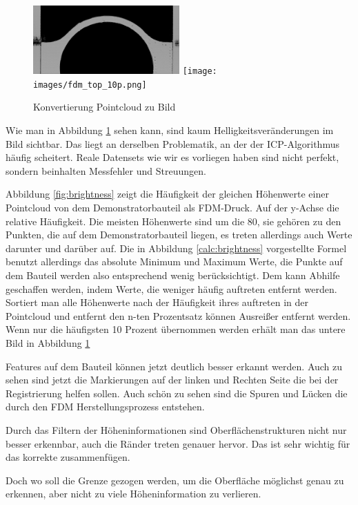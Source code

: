 \documentclass[../main.tex]{subfiles}
\begin{document}
\begin{figure}
    \centering
    \includegraphics[width=0.5\textwidth]{images/fdm_top_100p.png}
    \texttt{[image: images/fdm\_top\_10p.png]}
    \caption{Konvertierung Pointcloud zu Bild}
    \label{fig:image_from_pc}
\end{figure}

Wie man in Abbildung \ref{fig:image_from_pc} sehen kann, sind kaum Helligkeitsveränderungen
im Bild sichtbar. Das liegt an derselben Problematik, an der der ICP-Algorithmus häufig
scheitert. Reale Datensets wie wir es vorliegen haben sind nicht perfekt, sondern
beinhalten Messfehler und Streuungen. 

Abbildung \ref*{fig:brightness} zeigt die Häufigkeit der gleichen Höhenwerte einer
Pointcloud von dem Demonstratorbauteil als FDM-Druck.
 Auf der y-Achse die relative Häufigkeit.
Die meisten Höhenwerte sind um die 80, sie gehören zu den Punkten, die auf dem 
Demonstratorbauteil liegen, es treten allerdings auch Werte darunter und darüber auf. 
Die in Abbildung \ref*{calc:brightness} vorgestellte Formel benutzt allerdings 
das absolute Minimum und Maximum Werte, 
die Punkte auf dem Bauteil werden also entsprechend wenig
berücksichtigt. Dem kann Abhilfe geschaffen werden, indem Werte, die weniger häufig 
auftreten entfernt werden. Sortiert man alle Höhenwerte nach der Häufigkeit ihres 
auftreten in der Pointcloud und entfernt den n-ten Prozentsatz können Ausreißer 
entfernt werden. Wenn nur die häufigsten 10 Prozent übernommen werden erhält man 
das untere Bild in Abbildung \ref{fig:image_from_pc}

Features auf dem Bauteil können jetzt deutlich besser erkannt werden. Auch zu sehen
sind jetzt die Markierungen auf der linken und Rechten Seite die bei der Registrierung
helfen sollen. Auch schön zu sehen sind die Spuren und Lücken die durch den FDM 
Herstellungsprozess entstehen.

Durch das Filtern der Höheninformationen sind Oberflächenstrukturen nicht nur besser
erkennbar, auch die Ränder treten genauer hervor. Das ist sehr wichtig für das korrekte
zusammenfügen.

Doch wo soll die Grenze gezogen werden, um die Oberfläche möglichst genau zu erkennen,
aber nicht zu viele Höheninformation zu verlieren.
\end{document}
